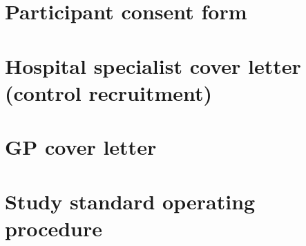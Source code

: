 \documentclass[a4paper,10pt]{article}
\begin{document}
\begin{appendices}
\section{Participant consent form}

\newpage

\section{Hospital specialist cover letter (control recruitment)}

\newpage

\section{GP cover letter}

\newpage

\section{Study standard operating procedure}

\newpage


\end{appendices}

\makeatletter
 \def\@biblabel#1{#1}
\makeatother



\end{document}
